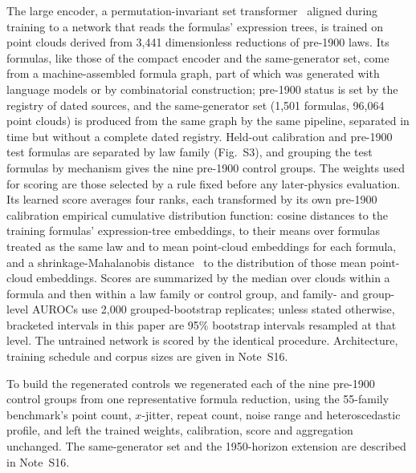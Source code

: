 \documentclass{article}
\begin{document}
The large encoder, a permutation-invariant set transformer~\cite{lee2019settransformer} aligned during training to a network that reads the formulas' expression trees, is trained on point clouds derived from 3,441 dimensionless reductions of pre-1900 laws. Its formulas, like those of the compact encoder and the same-generator set, come from a machine-assembled formula graph, part of which was generated with language models or by combinatorial construction; pre-1900 status is set by the registry of dated sources, and the same-generator set (1,501 formulas, 96,064 point clouds) is produced from the same graph by the same pipeline, separated in time but without a complete dated registry. Held-out calibration and pre-1900 test formulas are separated by law family (Fig.~S3), and grouping the test formulas by mechanism gives the nine pre-1900 control groups. The weights used for scoring are those selected by a rule fixed before any later-physics evaluation. Its learned score averages four ranks, each transformed by its own pre-1900 calibration empirical cumulative distribution function: cosine distances to the training formulas' expression-tree embeddings, to their means over formulas treated as the same law and to mean point-cloud embeddings for each formula, and a shrinkage-Mahalanobis distance~\cite{mahalanobis1936,ledoit2004} to the distribution of those mean point-cloud embeddings. Scores are summarized by the median over clouds within a formula and then within a law family or control group, and family- and group-level AUROCs use 2,000 grouped-bootstrap replicates; unless stated otherwise, bracketed intervals in this paper are 95\% bootstrap intervals resampled at that level. The untrained network is scored by the identical procedure. Architecture, training schedule and corpus sizes are given in Note~S16.

To build the regenerated controls we regenerated each of the nine pre-1900 control groups from one representative formula reduction, using the 55-family benchmark's point count, $x$-jitter, repeat count, noise range and heteroscedastic profile, and left the trained weights, calibration, score and aggregation unchanged. The same-generator set and the 1950-horizon extension are described in Note~S16.
\end{document}
